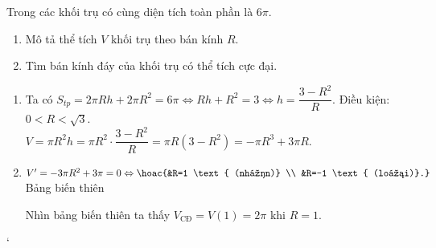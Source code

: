 \begin{bt}%
	Trong các khối trụ có cùng diện tích toàn phần là $6\pi $. 
	\begin{enumerate}
		\item Mô tả thể tích $V$ khối trụ theo bán kính $R$.
		\item Tìm bán kính đáy của khối trụ có thể tích cực đại.
	\end{enumerate}
	
	\loigiai
	{
		\begin{enumerate}
			\item Ta có $S_{tp}=2\pi Rh+2\pi R^2=6\pi \Leftrightarrow Rh+R^2=3\Leftrightarrow h=\dfrac{3-R^2}{R}$. Điều kiện: $0<R<\sqrt{3}$. \\
			$V=\pi R^2h=\pi R^2\cdot \dfrac{3-R^2}{R}=\pi R(3-R^2)=-\pi R^3+3\pi R$.
			\item $V'=-3\pi R^2+3\pi =0\Leftrightarrow \hoac{&R=1 \text{ (nhận)} \\ &R=-1 \text{ (loại)}.}$ \\
			Bảng biến thiên
			\begin{center}
			\end{center}
			Nhìn bảng biến thiên ta thấy $V_{\text{CĐ}}=V(1)=2\pi $ khi $R=1$.
		\end{enumerate} 
		
`	}
\end{bt}

